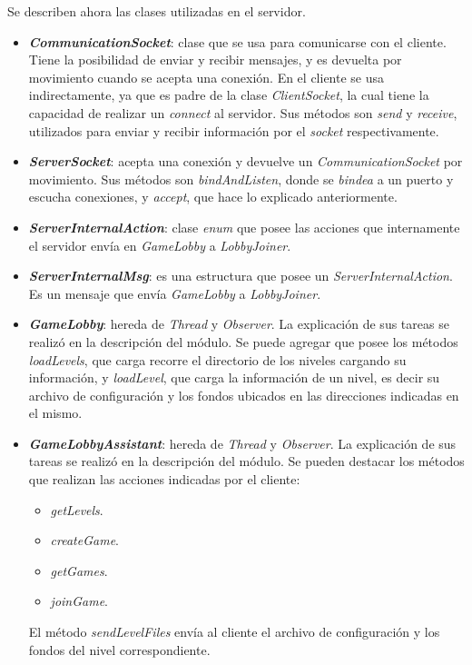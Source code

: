 Se describen ahora las clases utilizadas en el servidor.

\begin{itemize}
	\item \textbf{\textit{CommunicationSocket}}: clase que se usa para comunicarse con el cliente. Tiene la posibilidad de enviar y recibir mensajes, y es devuelta por movimiento cuando se acepta una conexión. En el cliente se usa indirectamente, ya que es padre de la clase \textit{ClientSocket}, la cual tiene la capacidad de realizar un \textit{connect} al servidor. Sus métodos son \textit{send} y \textit{receive}, utilizados para enviar y recibir información por el \textit{socket} respectivamente.
	
	\item \textbf{\textit{ServerSocket}}: acepta una conexión y devuelve un \textit{CommunicationSocket} por movimiento. Sus métodos son \textit{bindAndListen}, donde se \textit{bindea} a un puerto y escucha conexiones, y \textit{accept}, que hace lo explicado anteriormente.
	
	\item \textbf{\textit{ServerInternalAction}}: clase \textit{enum} que posee las acciones que internamente el servidor envía en \textit{GameLobby} a \textit{LobbyJoiner}.
	
	\item \textbf{\textit{ServerInternalMsg}}: es una estructura que posee un \textit{ServerInternalAction}. Es un mensaje que envía \textit{GameLobby} a \textit{LobbyJoiner}.
	
	\item \textbf{\textit{GameLobby}}: hereda de \textit{Thread} y \textit{Observer}. La explicación de sus tareas se realizó en la descripción del módulo. Se puede agregar que posee los métodos \textit{loadLevels}, que carga recorre el directorio de los niveles cargando su información, y \textit{loadLevel}, que carga la información de un nivel, es decir su archivo de configuración y los fondos ubicados en las direcciones indicadas en el mismo.
	
	\item \textbf{\textit{GameLobbyAssistant}}: hereda de \textit{Thread} y \textit{Observer}. La explicación de sus tareas se realizó en la descripción del módulo. Se pueden destacar los métodos que realizan las acciones indicadas por el cliente:
	\begin{itemize}
		\item \textit{getLevels}.
		\item \textit{createGame}.
		\item \textit{getGames}.
		\item \textit{joinGame}.
	\end{itemize}
	El método \textit{sendLevelFiles} envía al cliente el archivo de configuración y los fondos del nivel correspondiente.
	

\end{itemize}
